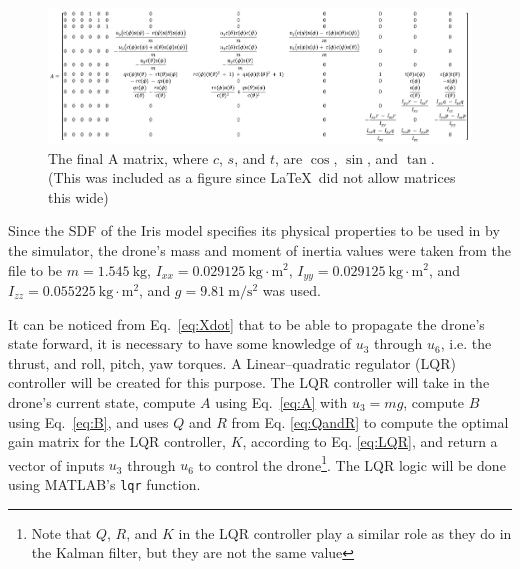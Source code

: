 \documentclass[letterpaper, preprint, paper,11pt]{AAS}	%
\begin{document}
\begin{figure}[H]
	\centering\includegraphics[width=\textwidth]{Figures/AMatrix}
	\caption{The final A matrix, where $c$, $s$, and $t$, are $\cos$, $\sin$, and $\tan$. (This was included as a figure since \LaTeX\ did not allow matrices this wide)}
	\label{fig:AMatrix}
\end{figure}

Since the SDF of the Iris model specifies its physical properties to be used in by the simulator, the drone's mass and moment of inertia values were taken from the file to be $m = 1.545\ \text{kg}$, $I_{xx} = 0.029125\ \text{kg}\cdot \text{m}^2$, $I_{yy} = 0.029125\ \text{kg}\cdot \text{m}^2$, and $I_{zz} = 0.055225\ \text{kg}\cdot \text{m}^2$, and $g = 9.81\ \text{m}/\text{s}^2$ was used.

It can be noticed from Eq.~\ref{eq:Xdot} that to be able to propagate the drone's state forward, it is necessary to have some knowledge of $u_3$ through $u_6$, i.e. the thrust, and roll, pitch, yaw torques. A Linear–quadratic regulator (LQR) controller will be created for this purpose. The LQR controller will take in the drone's current state, compute $A$ using Eq.~\ref{eq:A} with $u_3 = mg$, compute $B$ using Eq.~\ref{eq:B}, and uses $Q$ and $R$ from Eq. \ref{eq:QandR} to compute the optimal gain matrix for the LQR controller, $K$, according to Eq. \ref{eq:LQR}, and return a vector of inputs $u_3$ through $u_6$ to control the drone\footnote{Note that $Q$, $R$, and $K$ in the LQR controller play a similar role as they do in the Kalman filter, but they are not the same value}. The LQR logic will be done using MATLAB's \texttt{lqr} function\cite{LQR}.
\end{document}
